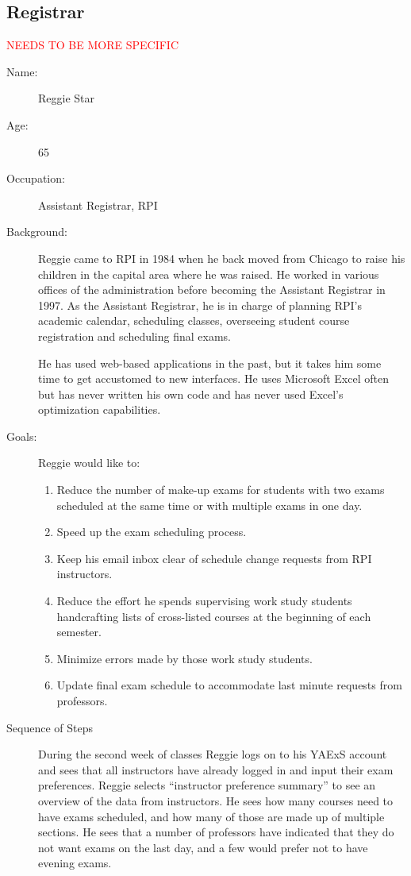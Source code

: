 \documentclass[11pt]{article}
\begin{document}
\subsection{Registrar}
\textcolor{red}{NEEDS TO BE MORE SPECIFIC}
\begin{description}
\item[Name:] Reggie Star
\item[Age:]  65
\item[Occupation:] Assistant Registrar, RPI 
\item[Background:] Reggie came to RPI in 1984 when he  back moved from
 Chicago to raise his children in the capital area where he was raised.
He worked in various offices of the administration before becoming
 the Assistant Registrar in 1997.  As the Assistant Registrar, he is in charge of planning RPI's academic calendar, scheduling classes, overseeing student course registration and scheduling final exams.

He has used web-based applications in the past, but it takes him some
time to get accustomed to new interfaces.
He uses Microsoft Excel often but has never written his own code
 and has never used Excel’s optimization capabilities.

\item[Goals:]
Reggie would like to:
\begin{enumerate}
\item Reduce the number of make-up exams for students with two exams scheduled at the same time or with multiple exams in one day.
\item Speed up the exam scheduling process.
\item Keep his email inbox clear of schedule change requests from RPI instructors.
\item Reduce the effort he spends supervising work study students handcrafting lists of cross-listed courses at the beginning of each semester.
\item Minimize errors made by those work study students.
\item Update final exam schedule to accommodate last minute requests
from professors.
\end{enumerate}

\item[Sequence of Steps]
During the second week of classes Reggie logs on to his YAExS account and
 sees that all instructors have already logged in and input their
 exam preferences.
Reggie selects “instructor preference summary” to see an overview of
 the data from instructors. He sees how many courses need to have exams
 scheduled, and how many of those are made up of multiple sections.
He sees that a number of professors have indicated that they do not
want exams on the last day, and a few would prefer not to have evening exams.


\end{description}
\end{document}
